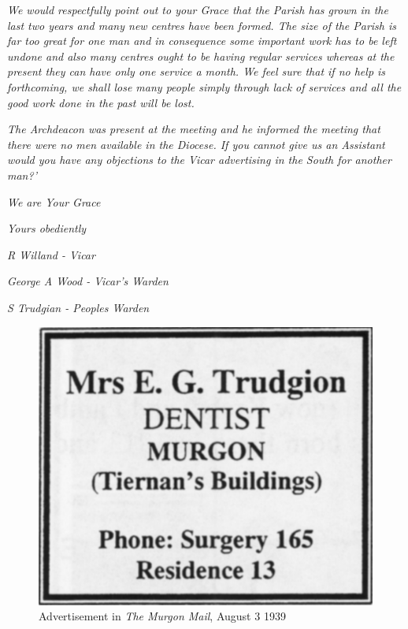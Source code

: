 \emph{We would respectfully point out to your Grace that the Parish has grown in the last two years and many new centres have been formed. The size of the Parish is far too great for one man and in consequence some important work has to be left undone and also many centres ought to be having regular services whereas at the present they can have only one service a month. We feel sure that if no help is forthcoming, we shall lose many people simply through lack of services and all the good work done in the past will be lost.}



\emph{The Archdeacon was present at the meeting and he informed the meeting that there were no men available in the Diocese. If you cannot give us an Assistant would you have any objections to the Vicar advertising in the South for another man?'}



\emph{We are Your Grace}



\emph{Yours obediently}



\emph{R Willand - Vicar}



\emph{George A Wood - Vicar's Warden}



\emph{S Trudgian - Peoples Warden}



\medskip








\begin{figure}
\begin{center}
\includegraphics[width=.5\linewidth,center]{../images/trudgionAd.jpg}
\caption{Advertisement in \emph{The Murgon Mail}, August 3 1939}
\end{center}
\end{figure}




